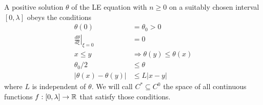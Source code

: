 \begin{lemma}
	\label{5-Zeroes-Lem-LE-Conditions}
	A positive solution $\theta$ of the \ac{LE} equation with $n\geq0$ on a suitably chosen interval $[0,\lambda]$ obeys the conditions
	\begin{align}
		\theta(0) 					&= \theta_0>0\label{5-Zeroes-Equ-LE-Conditions-Initial-1}\\
		\left.\frac{d\theta}{d\xi}\right|_{\xi=0} &= 0 \label{5-Zeroes-Equ-LE-Conditions-Initial-2}\\
		x\leq y 					&\Rightarrow \theta(y)\leq\theta(x)\label{5-Zeroes-Equ-LE-Conditions-3}\\
		\theta_0/2					&\leq \theta \label{5-Zeroes-Equ-LE-Conditions-4}\\
		|\theta(x)-\theta(y)|		&\leq L|x-y|\label{5-Zeroes-Equ-LE-Conditions-5}
	\end{align}
	where $L$ is independent of $\theta$.
	We will call $C^*\subseteq C^0$ the space of all continuous functions $f:[0,\lambda]\rightarrow\mathbb{R}$ that satisfy those conditions.
\end{lemma}
